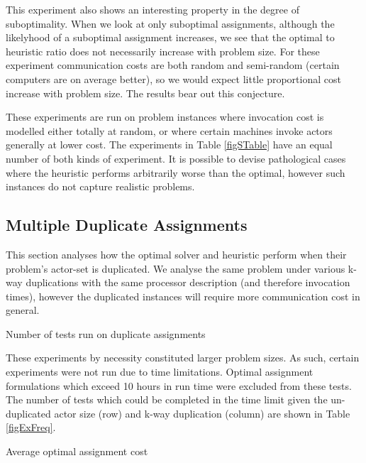 This experiment also shows an interesting property in the degree of suboptimality.
When we look at only suboptimal assignments, although the likelyhood of a suboptimal assignment increases, we see that the optimal to heuristic ratio does not necessarily increase with problem size.
For these experiment communication costs are both random and semi-random (certain computers are on average better), so we would expect little proportional cost increase with problem size.
The results bear out this conjecture.

These experiments are run on problem instances where invocation cost is modelled either totally at random, or where certain machines invoke actors generally at lower cost.
The experiments in Table \ref{figSTable} have an equal number of both kinds of experiment.
It is possible to devise pathological cases where the heuristic performs arbitrarily worse than the optimal, however such instances do not capture realistic problems.

\subsection{Multiple Duplicate Assignments}

This section analyses how the optimal solver and heuristic perform when their problem's actor-set is duplicated.
We analyse the same problem under various k-way duplications with the same processor description (and therefore invocation times), however the duplicated instances will require more communication cost in general.

\begin{table}
\begin{center}
	
\caption{Number of tests run on duplicate assignments}
\label{figExFreq}
\end{center}
\end{table}

These experiments by necessity constituted larger problem sizes.
As such, certain experiments were not run due to time limitations.
Optimal assignment formulations which exceed 10 hours in run time were excluded from these tests.
The number of tests which could be completed in the time limit given the un-duplicated actor size (row) and k-way duplication (column) are shown in Table \ref{figExFreq}.

\begin{table}
\begin{center}
	
\caption{Average optimal assignment cost}
\label{figExRamp}
\end{center}
\end{table}

